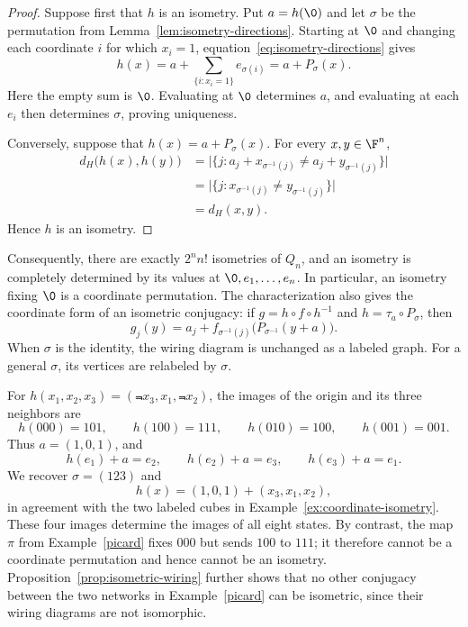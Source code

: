 \begin{proof}
    Suppose first that $h$ is an isometry. Put $a=h(\0)$ and let $\sigma$ be the permutation from Lemma~\ref{lem:isometry-directions}. Starting at $\0$ and changing each coordinate $i$ for which $x_i=1$, equation~\eqref{eq:isometry-directions} gives
    \[
        h(x)=a+\sum_{\{i:x_i=1\}}e_{\sigma(i)}
             =a+ P_\sigma(x).
    \]
    Here the empty sum is $\0$. Evaluating at $\0$ determines $a$, and evaluating at each $e_i$ then determines $\sigma$, proving uniqueness.

    Conversely, suppose that $h(x)=a+ P_\sigma(x)$. For every $x,y\in\F^n$,
    \begin{align*}
        d_H\bigl(h(x),h(y)\bigr)
        &=\bigl|\{j:a_j+ x_{\sigma^{-1}(j)}
                     \ne a_j+ y_{\sigma^{-1}(j)}\}\bigr|\\
        &=\bigl|\{j:x_{\sigma^{-1}(j)}\ne y_{\sigma^{-1}(j)}\}\bigr|\\
        &=d_H(x,y).
    \end{align*}
    Hence $h$ is an isometry.
\end{proof}

Consequently, there are exactly $2^n n!$ isometries of $Q_n$, and an isometry is completely determined by its values at $\0,e_1,\dots,e_n$. In particular, an isometry fixing $\0$ is a coordinate permutation. The characterization also gives the coordinate form of an isometric conjugacy: if $g=h\circ f\circ h^{-1}$ and $h=\tau_a\circ P_\sigma$, then
\[
    g_j(y)=a_j+
    f_{\sigma^{-1}(j)}\bigl(P_{\sigma^{-1}}(y+ a)\bigr).
\]
When $\sigma$ is the identity, the wiring diagram is unchanged as a labeled graph. For a general $\sigma$, its vertices are relabeled by $\sigma$.

\begin{example}\label{ex:recover-isometry}
    For $h(x_1,x_2,x_3)=(\Not{x}_3,x_1,\Not{x}_2)$, the images of the origin and its three neighbors are
    \[
        h(000)=101,\qquad h(100)=111,\qquad
        h(010)=100,\qquad h(001)=001.
    \]
    Thus $a=(1,0,1)$, and
    \[
        h(e_1)+ a=e_2,\qquad
        h(e_2)+ a=e_3,\qquad
        h(e_3)+ a=e_1.
    \]
    We recover $\sigma=(123)$ and
    \[
        h(x)=(1,0,1)+(x_3,x_1,x_2),
    \]
    in agreement with the two labeled cubes in Example~\ref{ex:coordinate-isometry}. These four images determine the images of all eight states. By contrast, the map $\pi$ from Example~\ref{picard} fixes $000$ but sends $100$ to $111$; it therefore cannot be a coordinate permutation and hence cannot be an isometry. Proposition~\ref{prop:isometric-wiring} further shows that no other conjugacy between the two networks in Example~\ref{picard} can be isometric, since their wiring diagrams are not isomorphic.
\end{example}

